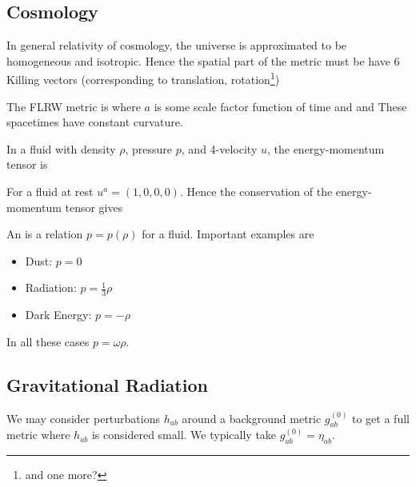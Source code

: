 \documentclass{article}
\begin{document}
\subsection{Cosmology}
In general relativity of cosmology, the universe is approximated to be homogeneous and isotropic. Hence the spatial part of the metric must be have 6 Killing vectors (corresponding to translation, rotation\footnote{and one more?})
\begin{definition}
The FLRW metric is 
where $a$ is some scale factor function of time and 
and 
These spacetimes have constant curvature.
\end{definition}

\begin{definition}
In a fluid with density $\rho$, pressure $p$, and 4-velocity $u$, the energy-momentum tensor is 
\end{definition}

\begin{lemma}
For a fluid at rest $u^a = (1,0,0,0)$. Hence the conservation of the energy-momentum tensor gives 
\end{lemma}

\begin{definition}
An  is a relation $p = p(\rho)$ for a fluid. Important examples are 
\begin{itemize}
    \item Dust: $p = 0$
    \item Radiation: $p = \frac{1}{3}\rho$
    \item Dark Energy: $p = - \rho$
\end{itemize}
In all these cases $p = \omega \rho$. 
\end{definition}

\subsection{Gravitational Radiation}

We may consider perturbations $h_{ab}$ around a background metric $g_{ab}^{(0)}$ to get a full metric 
where $h_{ab}$ is considered small. We typically take $g_{ab}^{(0)} = \eta_{ab}$. 
\end{document}
